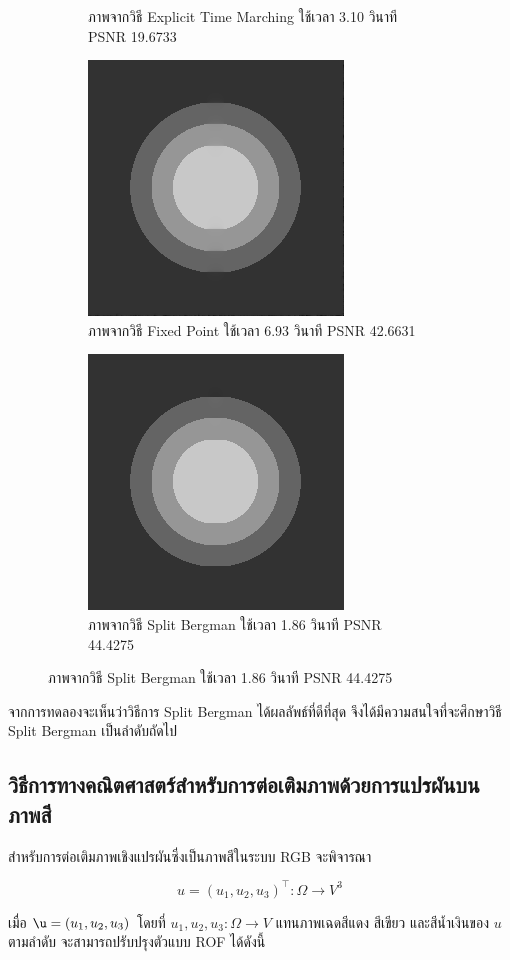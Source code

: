\documentclass[hidelinks,a4paper,14pt]{article}
\numberwithin{equation}{section}							%
\begin{document}
{\begin{figure}[H]
\begin{subfigure}{0.3\linewidth}
			\caption{ภาพจากวิธี Explicit Time Marching ใช้เวลา 3.10 วินาที PSNR 19.6733}
		\end{subfigure}
		\begin{subfigure}{0.3\linewidth}
			\centering
			\includegraphics[width=0.3\linewidth]{images/grayscale_inpaint/result_fixpoint.png}
			\caption{ภาพจากวิธี Fixed Point ใช้เวลา 6.93 วินาที PSNR 42.6631}
		\end{subfigure}
		\begin{subfigure}{0.3\linewidth}
			\centering
			\includegraphics[width=0.3\linewidth]{images/grayscale_inpaint/result_splitbergman.png}
				\caption{ภาพจากวิธี Split Bergman ใช้เวลา 1.86 วินาที PSNR 44.4275}
		\end{subfigure}
		\end{figure}
			
			จากการทดลองจะเห็นว่าวิธีการ Split Bergman ได้ผลลัพธ์ที่ดีที่สุด จึงได้มีความสนใจที่จะศึกษาวิธี Split Bergman เป็นลำดับถัดไป
			
			
			
			\subsection{วิธีการทางคณิตศาสตร์สำหรับการต่อเติมภาพด้วยการแปรผันบนภาพสี} 

			สำหรับการต่อเติมภาพเชิงแปรผันซึ่งเป็นภาพสีในระบบ RGB จะพิจารณา
			
			$$ u = (u_1,u_2,u_3)^{\top} : \Omega  \rightarrow V^3 $$

			\noindent เมื่อ $\u=(u_1,u_2,u_3)$ โดยที่ $u_1,u_2,u_3: \Omega  \rightarrow V$ แทนภาพเฉดสีแดง สีเขียว และสีน้ำเงินของ $u$ ตามลำดับ จะสามารถปรับปรุงตัวแบบ ROF ได้ดังนี้
			
}
\end{document}
